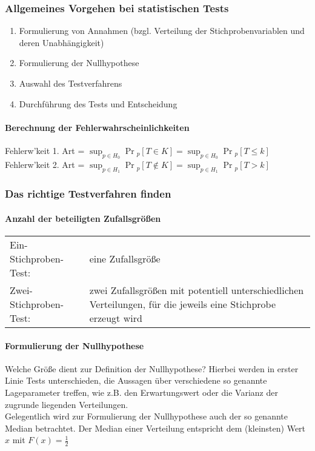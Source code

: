 \documentclass[a4paper,9pt]{extarticle}
\begin{document}
\subsubsection*{Allgemeines Vorgehen bei statistischen Tests}
\begin{enumerate}
	\item Formulierung von Annahmen (bzgl. Verteilung der Stichprobenvariablen und deren Unabhängigkeit)
	\item Formulierung der Nullhypothese
	\item Auswahl des Testverfahrens
	\item Durchführung des Tests und Entscheidung
\end{enumerate}

\paragraph*{Berechnung der Fehlerwahrscheinlichkeiten}
Fehlerw'keit 1. Art = $\sup_{p \in H_0} \Pr{}_p[T \in K] = \sup_{p \in H_0} \Pr{}_p[T ≤ k]$ \\
Fehlerw'keit 2. Art = $\sup_{p \in H_1} \Pr{}_p[T \not\in K] = \sup_{p \in H_1} \Pr{}_p[T > k]$

\subsubsection*{Das richtige Testverfahren finden}
\paragraph*{Anzahl der beteiligten Zufallsgrößen}
\begin{tabularx}{\columnwidth}{lX}
	Ein-Stichproben-Test: & eine Zufallsgröße \\
	Zwei-Stichproben-Test: & zwei Zufallsgrößen mit potentiell unterschiedlichen Verteilungen, für die jeweils eine Stichprobe erzeugt wird
\end{tabularx}

\paragraph*{Formulierung der Nullhypothese}
Welche Größe dient zur Definition der Nullhypothese? Hierbei werden in erster Linie Tests unterschieden, die Aussagen über verschiedene so genannte Lageparameter treffen, wie z.B. den Erwartungswert oder die Varianz der zugrunde liegenden Verteilungen. \\
Gelegentlich wird zur Formulierung der Nullhypothese auch der so genannte Median betrachtet. Der Median einer Verteilung entspricht dem (kleinsten) Wert $x$ mit $F(x) = \frac 1 2$
\end{document}
